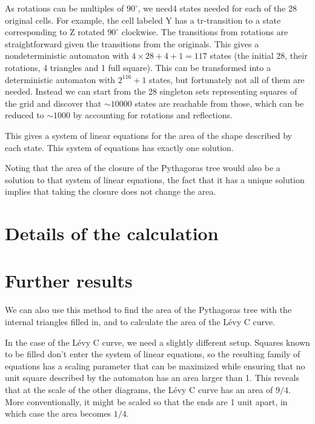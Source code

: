 \documentclass{article}
\newcommand{\bounding}{
\draw[tsty] (-2.5,1) -- (-1.5,0) -- (2.5,0) -- (3.5,1) -- (3.5,2.5) -- (2,4) -- (-1,4) -- (-2.5, 2.5) -- cycle;
}
\newcommand{\subt}[2]{
    \begin{scope}[yshift=1cm,rotate=45,scale=0.7071]
        #1
    \end{scope}
    \begin{scope}[xshift=0.5cm,yshift=1.5cm,rotate=-45,scale=0.7071]
        #2
    \end{scope}
}
\newcommand{\dup}[1]{\subt{#1}{#1}}
\newcommand{\gtree}[3]{
	#2
	\ifthenelse{#1<2}{
		#3
	}{
		\dup{\gtree{\the\numexpr#1-1}{#2}{#3}}
	}
}
\begin{document}
As rotations can be multiples of $90^\circ$, we need4 states needed for each of the 28 original cells. For example, the cell labeled Y has a tr-transition to a state corresponding to Z rotated $90^\circ$ clockwise.  The transitions from rotations are straightforward given the transitions from the originals. This gives a nondeterministic automaton with $4\times28+4+1 = 117$ states (the initial 28, their rotations, 4 triangles and 1 full square). This can be transformed into a deterministic automaton with $2^{116}+1$ states, but fortunately not all of them are needed. Instead we can start from the 28 singleton sets representing squares of the grid and discover that ${\sim}10000$ states are reachable from those, which can be reduced to ${\sim}1000$ by accounting for rotations and reflections.

This gives a system of linear equations for the area of the shape described by each state. This system of equations has exactly one solution.

Noting that the area of the closure of the Pythagoras tree would also be a solution to that system of linear equations, the fact that it has a unique solution implies that taking the closure does not change the area.

\section{Details of the calculation}


\section{Further results}
We can also use this method to find the area of the Pythagoras tree with the internal triangles filled in, and to calculate the area of the Lévy C curve.

In the case of the Lévy C curve, we need a slightly different setup. Squares known to be filled don't enter the system of linear equations, so the resulting family of equations has a scaling parameter that can be maximized while ensuring that no unit square described by the automaton has an area larger than 1. This reveals that at the scale of the other diagrams, the Lévy C curve has an area of $9/4$. More conventionally, it might be scaled so that the ends are 1 unit apart, in which case the area becomes $1/4$.

\end{document}
